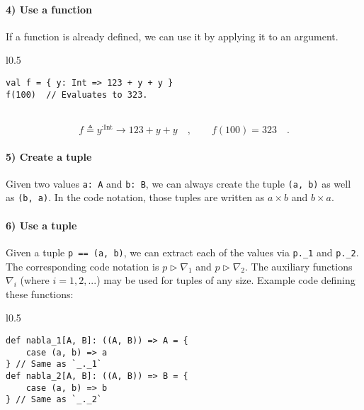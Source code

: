 \paragraph{4) Use a function}

If a function is already defined, we can use it by applying it to
an argument.

\begin{wrapfigure}{l}{0.5\columnwidth}%
\vspace{-0.65\baselineskip}
\begin{lstlisting}
val f = { y: Int => 123 + y + y }
f(100)  // Evaluates to 323.
\end{lstlisting}

\vspace{-0.25\baselineskip}
\end{wrapfigure}%

~\vspace{-0.65\baselineskip}
\[
f\triangleq y^{:\text{Int}}\rightarrow123+y+y\quad,\quad\quad f(100)=323\quad.
\]
\vspace{-0.85\baselineskip}


\paragraph{5) Create a tuple}

Given two values \lstinline!a: A! and \lstinline!b: B!, we can always
create the tuple \lstinline!(a, b)! as well as \lstinline!(b, a)!.
In the code notation, those tuples are written as $a\times b$ and
$b\times a$.

\paragraph{6) Use a tuple}

Given a tuple \lstinline!p == (a, b)!, we can extract each of the
values via \lstinline!p._1! and \lstinline!p._2!. The corresponding
code notation is $p\triangleright\nabla_{1}$ and $p\triangleright\nabla_{2}$.
The auxiliary functions $\nabla_{i}$ (where $i=1,2,...$) may be
used for tuples of any size. Example code defining these functions:

\begin{wrapfigure}{l}{0.5\columnwidth}%
\vspace{-0.75\baselineskip}
\begin{lstlisting}
def nabla_1[A, B]: ((A, B)) => A = {
    case (a, b) => a
} // Same as `_._1`
def nabla_2[A, B]: ((A, B)) => B = {
    case (a, b) => b
} // Same as `_._2`
\end{lstlisting}

\vspace{-1.2\baselineskip}
\end{wrapfigure}%


